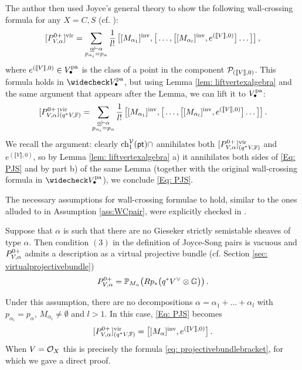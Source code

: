 \documentclass[a4paper, 12pt]{amsart}
\begin{document}
\begin{appendices}
The author then used Joyce's general theory to show the following wall-crossing formula for any $X=C,S$ (cf.  \cite[Theorem A.4]{Bo21.5}):
 $$[P^{0+}_{V,\alpha}]^{\mathrm{vir}}= \sum_{\substack{\underline{\alpha} \vdash \alpha\\ p_{\alpha_i}=p_{\alpha}}}\frac{1}{l!}\, \big[[M_{\alpha_1}]^{\mathrm{inv}}, \big[\ldots, \big[[M_{\alpha_l}]^{\mathrm{inv}}, e^{(\llbracket V\rrbracket,0)}\big]\ldots\big]\big]\,,$$
 where $e^{(\llbracket V\rrbracket,0)}\in V_\bullet^{\mathop{\rm pa}\nolimits}$ is the class of a point in the component ${\mathcal P}_{(\llbracket V\rrbracket ,0)}$. This formula holds in $\widecheck V_\bullet^{\pa}$, but using Lemma \ref{lem: liftvertexalgebra} and the same argument that appears after the Lemma, we can lift it to $V_\bullet^{\mathop{\rm pa}\nolimits}$:
\begin{equation}
\label{Eq: PJS} [P^{0+}_{V,\alpha}]^{\mathrm{vir}}_{(q^*V,{\mathbb{F}})}= \sum_{\substack{\underline{\alpha} \vdash \alpha\\ p_{\alpha_i}=p_{\alpha}}}\frac{1}{l!}\, \big[[M_{\alpha_1}]^{\mathrm{inv}}, \big[\ldots, \big[[M_{\alpha_l}]^{\mathrm{inv}}, e^{(\llbracket V\rrbracket,0)}\big]\ldots\big]\big]\,.
\end{equation}
We recall the argument: clearly $\mathrm{ch}_1^{{\mathcal V}}({\mathsf{pt}})\cap$ annihilates both  $[P^{0+}_{V,\alpha}]^{\mathrm{vir}}_{(q^*V,{\mathbb{F}})}$ and $e^{(\llbracket V\rrbracket,0)}$, so by Lemma \ref{lem: liftvertexalgebra} a) it annihilates both sides of \eqref{Eq: PJS} and by part b) of the same Lemma (together with the original wall-crossing formula in $\widecheck V_\bullet^{\pa}$), we conclude \eqref{Eq: PJS}.

The necessary assumptions for wall-crossing formulae to hold, similar to the ones alluded to in Assumption \ref{ass:WCpair}, were explicitly checked in \cite[Appendix]{Bo21.5}.

\begin{remark}\label{rem: JSprojectivebundle}
    Suppose that $\alpha$ is such that there are no Gieseker strictly semistable sheaves of type $\alpha$. Then condition $(3)$ in the definition of Joyce-Song pairs is vacuous and $P^{0+}_{V,\alpha}$ admits a description as a virtual projective bundle (cf. Section \ref{sec: virtualprojectivebundle})
    \[P^{0+}_{V,\alpha}={\mathbb{P}}_{M_\alpha}\big(Rp_\ast\big(q^\ast V^\vee\otimes {\mathbb{G}}\big)\big)\,.\]
    
   Under this assumption, there are no decompositions $\alpha=\alpha_1+\ldots+\alpha_l$ with $p_{\alpha_i}=p_{\alpha}$, $M_{\alpha_i}\neq \emptyset$ and $l>1$. In this case, \eqref{Eq: PJS} becomes
    \[[P^{0+}_{V,\alpha}]^{\mathrm{vir}}_{(q^*V,{\mathbb{F}})}=\big[[M_\alpha]^{\mathrm{inv}}, e^{(\llbracket V\rrbracket,0)}\big]\,.\]
When $V={\mathcal O}_X$ this is precisely the formula \eqref{eq: projectivebundlebracket}, for which we gave a direct proof. 
\end{remark}



\end{appendices}
\end{document}
